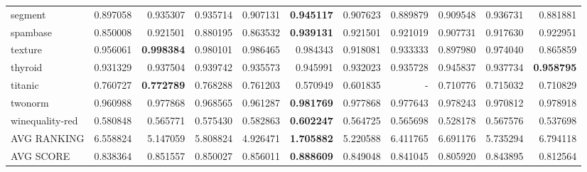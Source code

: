 \begin{tabular}{lrrrrrrrrrr}
segment         &   0.897058 &  0.935307 &  0.935714 &  0.907131 &  \textbf{0.945117} &  0.907623 &  0.889879 &  0.909548 &  0.936731 &  0.881881 \\
spambase        &   0.850008 &  0.921501 &  0.880195 &  0.863532 &  \textbf{0.939131} &  0.921501 &  0.921019 &  0.907731 &  0.917630 &  0.922951 \\
texture         &   0.956061 &  \textbf{0.998384} &  0.980101 &  0.986465 &  0.984343 &  0.918081 &  0.933333 &  0.897980 &  0.974040 &  0.865859 \\
thyroid         &   0.931329 &  0.937504 &  0.939742 &  0.935573 &  0.945991 &  0.932023 &  0.935728 &  0.945837 &  0.937734 &  \textbf{0.958795} \\
titanic         &   0.760727 &  \textbf{0.772789} &  0.768288 &  0.761203 &  0.570949 &  0.601835 &       -   &  0.710776 &  0.715032 &  0.710829 \\
twonorm         &   0.960988 &  0.977868 &  0.968565 &  0.961287 &  \textbf{0.981769} &  0.977868 &  0.977643 &  0.978243 &  0.970812 &  0.978918 \\
winequality-red &   0.580848 &  0.565771 &  0.575430 &  0.582863 &  \textbf{0.602247} &  0.564725 &  0.565698 &  0.528178 &  0.567576 &  0.537698 \\
\bottomrule
AVG RANKING & 6.558824 & 5.147059 & 5.808824 & 4.926471 & \textbf{1.705882} & 5.220588 & 6.411765 & 6.691176 & 5.735294 & 6.794118 \\
AVG SCORE & 0.838364 & 0.851557 & 0.850027 & 0.856011 & \textbf{0.888609} & 0.849048 & 0.841045 & 0.805920 & 0.843895 & 0.812564 \\
\end{tabular}
